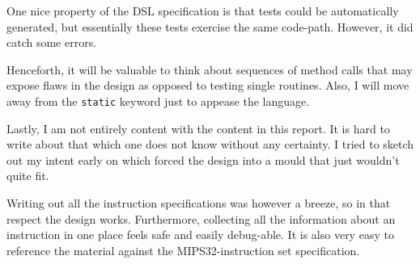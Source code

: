 \documentclass[a4paper]{article}
\newcommand{\mij}[1]{\texttt{#1}}
\begin{document}
One nice property of the DSL specification is that tests could be
automatically generated, but essentially these tests exercise the same
code-path. However, it did catch some errors.

Henceforth, it will be valuable to think about sequences of method
calls that may expose flaws in the design as opposed to testing single
routines. Also, I will move away from the \mij{static} keyword just to
appease the language.

Lastly, I am not entirely content with the content in this report.  It
is hard to write about that which one does not know without any
certainty. I tried to sketch out my intent early on which forced the
design into a mould that just wouldn't quite fit.

Writing out all the instruction specifications was however a breeze,
so in that respect the design works. Furthermore, collecting all the
information about an instruction in one place feels safe and easily
debug-able. It is also very easy to reference the material against
the MIPS32-instruction set specification.
\end{document}
